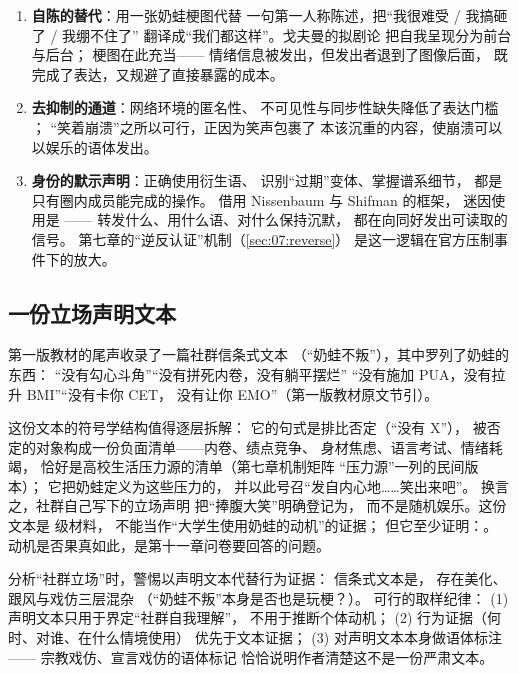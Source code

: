\begin{enumerate}[label=(\arabic*),leftmargin=2.4em]
  \item \textbf{自陈的替代}：用一张奶蛙梗图代替
        一句第一人称陈述，把“我很难受 / 我搞砸了 / 我绷不住了”
        翻译成“我们都这样”。戈夫曼的拟剧论
        把自我呈现分为前台与后台\cite{goffman1959presentation}；
        梗图在此充当——
        情绪信息被发出，但发出者退到了图像后面，
        既完成了表达，又规避了直接暴露的成本。
  \item \textbf{去抑制的通道}：网络环境的匿名性、
        不可见性与同步性缺失降低了表达门槛
        \cite{suler2004disinhibition}；
        “笑着崩溃”之所以可行，正因为笑声包裹了
        本该沉重的内容，使崩溃可以以娱乐的语体发出。
  \item \textbf{身份的默示声明}：正确使用衍生语、
        识别“过期”变体、掌握谱系细节，
        都是只有圈内成员能完成的操作。
        借用 Nissenbaum 与 Shifman 的框架，
        迷因使用是
        \cite{nissenbaum2015contested}——
        转发什么、用什么语、对什么保持沉默，
        都在向同好发出可读取的信号。
        第七章的“逆反认证”机制（\ref{sec:07:reverse}）
        是这一逻辑在官方压制事件下的放大。
\end{enumerate}

\subsection{一份立场声明文本}

第一版教材的尾声收录了一篇社群信条式文本
（“奶蛙不叛”），其中罗列了奶蛙的东西：
“没有勾心斗角”“没有拼死内卷，没有躺平摆烂”
“没有施加 PUA，没有拉升 BMI”“没有卡你 CET，
没有让你 EMO”（第一版教材原文节引）。

这份文本的符号学结构值得逐层拆解：
它的句式是排比否定（“没有 X”），
被否定的对象构成一份负面清单——内卷、绩点竞争、
身材焦虑、语言考试、情绪耗竭，
恰好是高校生活压力源的清单（第七章机制矩阵
“压力源”一列的民间版本）；
它把奶蛙定义为这些压力的，
并以此号召“发自内心地……笑出来吧”。
换言之，社群自己写下的立场声明
把“捧腹大笑”明确登记为，
而不是随机娱乐。这份文本是  级材料，
不能当作“大学生使用奶蛙的动机”的证据；
但它至少证明：。
动机是否果真如此，是第十一章问卷要回答的问题。

\begin{nlmethod}
  分析“社群立场”时，警惕以声明文本代替行为证据：
  信条式文本是，
  存在美化、跟风与戏仿三层混杂
  （“奶蛙不叛”本身是否也是玩梗？）。
  可行的取样纪律：
  (1) 声明文本只用于界定“社群自我理解”，
  不用于推断个体动机；
  (2) 行为证据（何时、对谁、在什么情境使用）
  优先于文本证据；
  (3) 对声明文本本身做语体标注——
  宗教戏仿、宣言戏仿的语体标记
  恰恰说明作者清楚这不是一份严肃文本。
\end{nlmethod}

